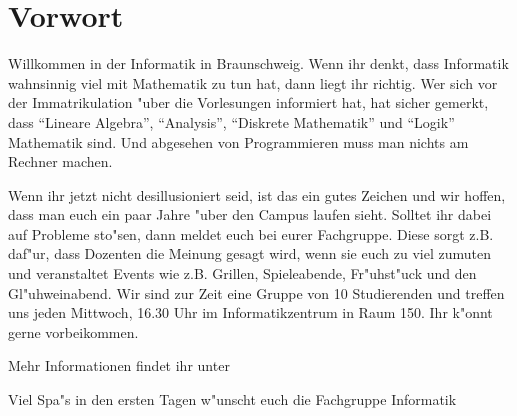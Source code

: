 \section*{Vorwort}

\renewcommand{\baselinestretch}{0.75}\normalsize
Willkommen in der Informatik in Braunschweig.
Wenn ihr denkt, dass Informatik wahnsinnig viel mit Mathematik zu tun hat, dann liegt ihr richtig.
Wer sich vor der Immatrikulation "uber die Vorlesungen informiert hat, hat sicher gemerkt, dass "`Lineare Algebra"', "`Analysis"', "`Diskrete Mathematik"' und "`Logik"' Mathematik sind. Und abgesehen von Programmieren muss man nichts am Rechner machen.
 
Wenn ihr jetzt nicht desillusioniert seid, ist das ein gutes Zeichen und wir
hoffen, dass man euch ein paar Jahre "uber den Campus laufen sieht. Solltet ihr dabei auf Probleme sto"sen, dann meldet euch bei eurer Fachgruppe. Diese sorgt z.B. daf"ur, dass Dozenten die Meinung gesagt wird, wenn sie euch zu viel zumuten und veranstaltet Events wie z.B. Grillen, Spieleabende, Fr"uhst"uck und den Gl"uhweinabend. Wir sind zur Zeit eine Gruppe von 10 Studierenden und treffen uns jeden Mittwoch, 16.30 Uhr im Informatikzentrum in Raum 150. Ihr k"onnt gerne vorbeikommen. 

Mehr Informationen findet ihr unter \mbox{}

Viel Spa"s in den ersten Tagen w"unscht euch die Fachgruppe Informatik

\renewcommand{\baselinestretch}{1}\normalsize